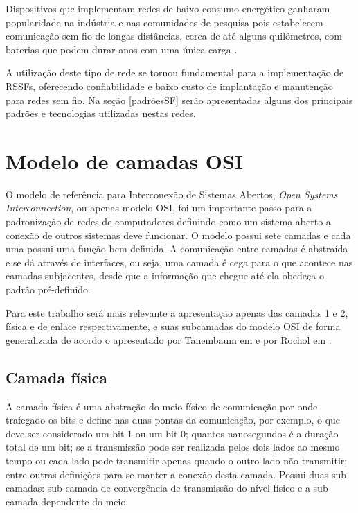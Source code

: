 Dispositivos que implementam redes de baixo consumo energético ganharam popularidade na indústria e nas comunidades de pesquisa pois estabelecem comunicação sem fio de longas distâncias, cerca de até alguns quilômetros, com baterias que podem durar anos com uma única carga \cite{mekki2019comparative}.

A utilização deste tipo de rede se tornou fundamental para a implementação de RSSFs, oferecendo confiabilidade e baixo custo de implantação e manutenção para redes sem fio. Na seção \ref{padrõesSF} serão apresentadas alguns dos principais padrões e tecnologias utilizadas nestas redes.

\section{Modelo de camadas OSI}
\label{osi}
O modelo de referência para Interconexão de Sistemas Abertos, \emph{Open Systems Interconnection}, ou apenas modelo OSI, foi um importante passo para a padronização de redes de computadores definindo como um sistema aberto a conexão de outros sistemas deve funcionar. O modelo possui sete camadas e cada uma possui uma função bem definida. A comunicação entre camadas é abstraída e se dá através de interfaces, ou seja, uma camada é cega para o que acontece nas camadas subjacentes, desde que a informação que chegue até ela obedeça o padrão pré-definido.


Para este trabalho será mais relevante a apresentação apenas das camadas 1 e 2, física e de enlace respectivamente, e suas subcamadas do modelo OSI de forma generalizada de acordo o apresentado por Tanembaum em \cite{tanembaum2011} e por Rochol em \cite{rochol2018sistemas}.

\subsection{Camada física}
A camada física é uma abstração do meio físico de comunicação por onde trafegado os bits e define nas duas pontas da comunicação, por exemplo, o que deve ser considerado um bit 1 ou um bit 0; quantos nanosegundos é a duração total de um bit; se a transmissão pode ser realizada pelos dois lados ao mesmo tempo ou cada lado pode transmitir apenas quando o outro lado não transmitir; entre outras definições para se manter a conexão desta camada. Possui duas sub-camadas: sub-camada de convergência de transmissão do nível físico e a sub-camada dependente do meio.


